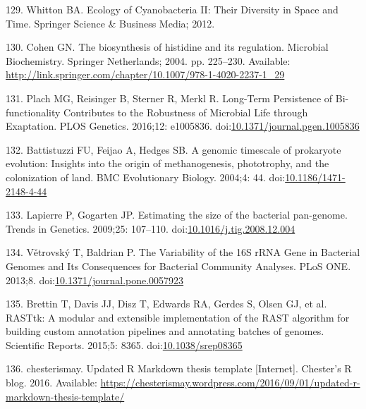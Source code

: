 \documentclass[12pt,twoside]{reedthesis}
\begin{document}
  \hypertarget{ref-whittonux5fecologyux5f2012}{}
  129. Whitton BA. Ecology of Cyanobacteria II: Their Diversity in Space
  and Time. Springer Science \& Business Media; 2012.
  
  \hypertarget{ref-cohenux5fbiosynthesisux5f2004}{}
  130. Cohen GN. The biosynthesis of histidine and its regulation.
  Microbial Biochemistry. Springer Netherlands; 2004. pp. 225--230.
  Available:
  \url{http://link.springer.com/chapter/10.1007/978-1-4020-2237-1_29}
  
  \hypertarget{ref-plachux5flong-termux5f2016}{}
  131. Plach MG, Reisinger B, Sterner R, Merkl R. Long-Term Persistence of
  Bi-functionality Contributes to the Robustness of Microbial Life through
  Exaptation. PLOS Genetics. 2016;12: e1005836.
  doi:\href{https://doi.org/10.1371/journal.pgen.1005836}{10.1371/journal.pgen.1005836}
  
  \hypertarget{ref-battistuzziux5fgenomicux5f2004}{}
  132. Battistuzzi FU, Feijao A, Hedges SB. A genomic timescale of
  prokaryote evolution: Insights into the origin of methanogenesis,
  phototrophy, and the colonization of land. BMC Evolutionary Biology.
  2004;4: 44.
  doi:\href{https://doi.org/10.1186/1471-2148-4-44}{10.1186/1471-2148-4-44}
  
  \hypertarget{ref-lapierreux5festimatingux5f2009}{}
  133. Lapierre P, Gogarten JP. Estimating the size of the bacterial
  pan-genome. Trends in Genetics. 2009;25: 107--110.
  doi:\href{https://doi.org/10.1016/j.tig.2008.12.004}{10.1016/j.tig.2008.12.004}
  
  \hypertarget{ref-vetrovskyux5fvariabilityux5f2013}{}
  134. Větrovský T, Baldrian P. The Variability of the 16S rRNA Gene in
  Bacterial Genomes and Its Consequences for Bacterial Community Analyses.
  PLoS ONE. 2013;8.
  doi:\href{https://doi.org/10.1371/journal.pone.0057923}{10.1371/journal.pone.0057923}
  
  \hypertarget{ref-brettinux5frasttk:ux5f2015}{}
  135. Brettin T, Davis JJ, Disz T, Edwards RA, Gerdes S, Olsen GJ, et al.
  RASTtk: A modular and extensible implementation of the RAST algorithm
  for building custom annotation pipelines and annotating batches of
  genomes. Scientific Reports. 2015;5: 8365.
  doi:\href{https://doi.org/10.1038/srep08365}{10.1038/srep08365}
  
  \hypertarget{ref-chesterismayux5fupdatedux5f2016}{}
  136. chesterismay. Updated R Markdown thesis template {[}Internet{]}.
  Chester's R blog. 2016. Available:
  \url{https://chesterismay.wordpress.com/2016/09/01/updated-r-markdown-thesis-template/}
  
\end{document}
